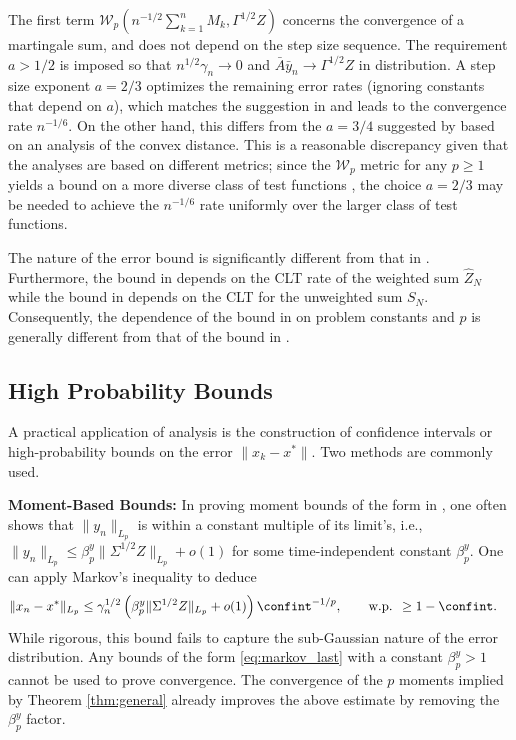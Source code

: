 \documentclass[11pt]{article}
\begin{document}
The first term $\mathcal{W}_{p}(n^{-1/2}\sum_{k=1}^n M_k, \Gamma^{1/2}Z)$ concerns the convergence of a martingale sum, and does not depend on the step size sequence. 
The requirement $a > 1/2$ is imposed so that $n^{1/2} \gamma_n \to 0$ and $\bar{A} \bar{y}_n \to \Gamma^{1/2} Z$ in distribution. 
A step size exponent $a = 2/3$ optimizes the remaining error rates (ignoring constants that depend on $a$), which matches the suggestion in \citep{moulines_bach,srikant2024CLT} and leads to the convergence rate $n^{-1/6}$.
On the other hand, this differs from the $a = 3/4$ suggested by \citet{sheshukova2025gaussianapproximationmultiplierbootstrap} based on an analysis of the convex distance. 
This is a reasonable discrepancy given that the analyses are based on different metrics; since the $\mathcal{W}_p$ metric for any $p \geq 1$ yields a bound on a more diverse class of test functions \citep{nourdin2021multivariatenormalapproximationwiener}, the choice $a = 2/3$ may be needed to achieve the $n^{-1/6}$ rate uniformly over the larger class of test functions. 


The nature of the error bound is significantly different from that in .
Furthermore, the bound in  depends on the CLT rate of the weighted sum $\hat{Z}_N$ while the bound in  depends on the CLT for the unweighted sum $S_N$. 
Consequently, the dependence of the bound in  on problem constants and $p$ is generally different from that of the bound in .






\subsection{High Probability Bounds}
A practical application of \nonasymptotic analysis is the construction of confidence intervals or high-probability bounds on the error $\lVert x_k - x^* \rVert$. 
Two methods are commonly used.


\textbf{Moment-Based Bounds:}
In proving moment bounds of the form in , one often shows that $\lVert y_n \rVert_{L_p}$ is within a constant multiple of its limit's, i.e., $\lVert y_n \rVert_{L_p} \leq \beta_p^y  \lVert \Sigma^{1/2}Z \rVert_{L_p} + o(1)$ for some time-independent constant $\beta_p^y$.
One can apply Markov's inequality to deduce 
\begin{equation}\label{eq:markov_last}
\begin{split}
    \lVert x_n - x^* \rVert_{L_p}
    &\leq
    \gamma_n^{1/2} \left( \beta_p^y \lVert \Sigma^{1/2} Z \rVert_{L_p} + o(1)\right)  \confint^{-1/p} 
    , 
    \qquad \text{w.p. } \geq 1 - \confint
    .     
\end{split}
\end{equation}
While rigorous, this bound fails to capture the sub-Gaussian nature of the error distribution. 
Any bounds of the form \eqref{eq:markov_last} with a constant $\beta_p^y > 1$ cannot be used to prove convergence. 
The convergence of the $p$ moments implied by Theorem \ref{thm:general} already improves the above estimate by removing the $\beta_p^y$ factor.
\end{document}
